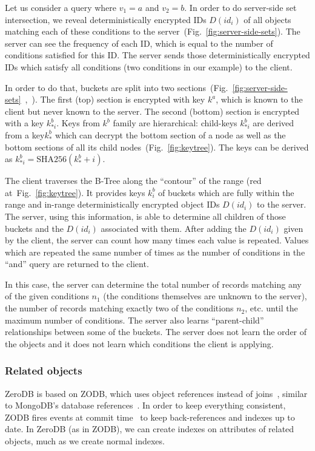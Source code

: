 \documentclass[notitlepage]{revtex4-1}
\newcommand{\figref}[1]{Fig.~\ref{#1}}
\begin{document}
Let us consider a query where $v_1=a$ and $v_2=b$.
In order to do server-side set intersection, we reveal deterministically encrypted IDs $D(id_i)$ of all objects matching each of these conditions to the server~(\figref{fig:server-side-sets}).
The server can see the frequency of each ID, which is equal to the number of conditions satisfied for this ID.
The server sends those deterministically encrypted IDs which satisfy all conditions (two conditions in our example) to the client.

In order to do that, buckets are split into two sections~(\figref{fig:server-side-sets}~,~).
The first (top) section is encrypted with key $k^a$, which is known to the client but never known to the server.
The second (bottom) section is encrypted with a key $k^b_{*i}$.
Keys from $k^b$ family are hierarchical: child-keys $k^b_{*i}$ are derived from a key$k^b_*$  which can decrypt the bottom section of a node as well as the bottom sections of all its child nodes~(\figref{fig:keytree}).
The keys can be derived as $k^b_{*i} = \mbox{SHA256}(k^b_* + i)$.

The client traverses the B-Tree along the ``contour'' of the range (red at~\figref{fig:keytree}).
It provides keys $k^b_i$ of buckets which are fully within the range and in-range deterministically encrypted object IDs $D(id_i)$ to the server.
The server, using this information, is able to determine all children of those buckets and the $D(id_i)$ associated with them.
After adding the $D(id_i)$ given by the client, the server can count how many times each value is repeated.
Values which are repeated the same number of times as the number of conditions in the ``and'' query are returned to the client.

In this case, the server can determine the total number of records matching any of the given conditions $n_1$ (the conditions themselves are unknown to the server),
the number of records matching exactly two of the conditions $n_2$,
etc. until the maximum number of conditions.
The server also learns ``parent-child'' relationships between some of the buckets.
The server does not learn the order of the objects and it does not learn which conditions the client is applying.

\subsubsection{Related objects}

ZeroDB is based on ZODB, which uses object references instead of joins~\cite{zodb-references},
similar to MongoDB's database references~\cite{mongo-db-references}.
In order to keep everything consistent, ZODB fires events at commit time~\cite{zope-events} to keep back-references and indexes up to date.
In ZeroDB (as in ZODB), we can create indexes on attributes of related objects, much as we create normal indexes.
\end{document}
